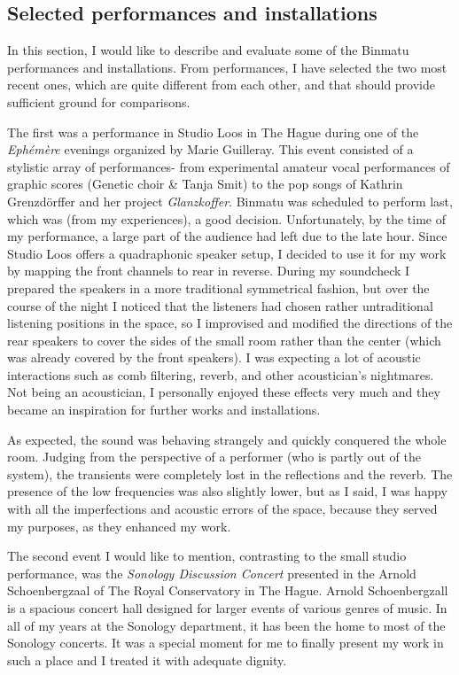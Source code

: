 \documentclass[12pt,a4paper,oneside]{report}
\begin{document}
\subsection{Selected performances and installations} In this section, I would like to describe and evaluate some of the Binmatu performances and installations. From performances, I have selected the two most recent ones, which are quite different from each other, and that should provide sufficient ground for comparisons. 

The first was a performance in Studio Loos in The Hague during one of the \emph{Ephémère} evenings organized by Marie Guilleray. This event consisted of a stylistic array of performances- from experimental amateur vocal performances of graphic scores (Genetic choir \& Tanja Smit) to the pop songs of Kathrin Grenzdörffer and her project \emph{Glanzkoffer}. Binmatu was scheduled to perform last, which was (from my experiences), a good decision. Unfortunately, by the time of my performance, a large part of the audience had left due to the late hour. Since Studio Loos offers a quadraphonic speaker setup, I decided to use it for my work by mapping the front channels to rear in reverse. During my soundcheck I prepared the speakers in a more traditional symmetrical fashion, but over the course of the night I noticed that the listeners had chosen rather untraditional listening positions in the space, so I improvised and modified the directions of the rear speakers to cover the sides of the small room rather than the center (which was already covered by the front speakers). I was expecting a lot of acoustic interactions such as comb filtering, reverb, and other acoustician's nightmares. Not being an acoustician, I personally enjoyed these effects very much and they became an inspiration for further works and installations.

As expected, the sound was behaving strangely and quickly conquered the whole room. Judging from the perspective of a performer (who is partly out of the system), the transients were completely lost in the reflections and the reverb. The presence of the low frequencies was also slightly lower, but as I said, I was happy with all the imperfections and acoustic errors of the space, because they served my purposes, as they enhanced my work.

The second event I would like to mention, contrasting to the small studio performance, was the \emph{Sonology Discussion Concert} presented in the Arnold Schoenbergzaal of The Royal Conservatory in The Hague. Arnold Schoenbergzall is a spacious concert hall designed for larger events of various genres of music. In all of my years at the Sonology department, it has been the home to most of the Sonology concerts. It was a special moment for me to finally present my work in such a place and I treated it with adequate dignity.
\end{document}
